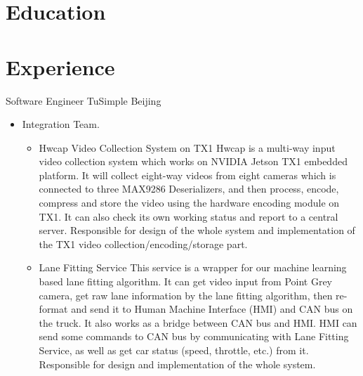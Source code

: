 \documentclass[10pt,a4paper,roman]{moderncv} %
\begin{document}
\makecvtitle

\vspace{-1cm}

\section{Education}

\section{Experience}
        {Software Engineer}
        {}
        {TuSimple Beijing}
        {}
        {\begin{itemize}%
         \item Integration Team.
               \begin{itemize}%
               \item Hwcap Video Collection System on TX1\newline{}%
                     Hwcap is a multi-way input video collection system which works on NVIDIA Jetson TX1 embedded platform. It will collect eight-way videos from eight cameras which is connected to three MAX9286 Deserializers\footnotemark[1]{}, and then process, encode, compress and store the video using the hardware encoding module on TX1. It can also check its own working status and report to a central server.
                     Responsible for design of the whole system and implementation of the TX1 video collection/encoding/storage part.
               \item Lane Fitting Service\newline{}%
                     This service is a wrapper for our machine learning based lane fitting algorithm. It can get video input from Point Grey camera, get raw lane information by the lane fitting algorithm, then re-format and send it to Human Machine Interface (HMI) and CAN bus on the truck.
                     It also works as a bridge between CAN bus and HMI. HMI can send some commands to CAN bus by communicating with Lane Fitting Service, as well as get car status (speed, throttle, etc.) from it.
                     Responsible for design and implementation of the whole system.
               \end{itemize}
         \end{itemize}}
\end{document}
